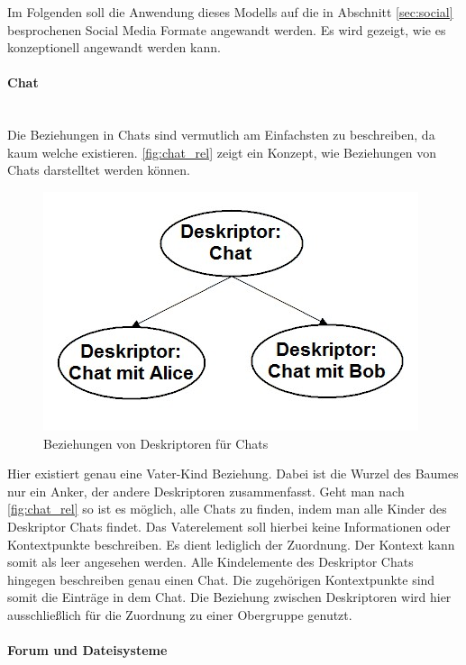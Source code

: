\documentclass[a4paper]{article}
\begin{document}
	Im Folgenden soll die Anwendung dieses Modells auf die in Abschnitt
	\ref{sec:social} besprochenen Social Media Formate angewandt werden. 
	Es wird gezeigt, wie es	konzeptionell angewandt werden kann.
	
	\paragraph{Chat}\mbox{} \\
	
	Die Beziehungen in Chats sind vermutlich am Einfachsten zu beschreiben, da
	kaum welche existieren. \autoref{fig:chat_rel} zeigt ein Konzept, wie
	Beziehungen von Chats darstelltet werden können.

	\begin{figure}[H]
		\centerline{
			\includegraphics[scale=0.6]{../Bilder/chat_rel.jpg}
		}
		\caption{Beziehungen von Deskriptoren für Chats}
		\label{fig:chat_rel}
	\end{figure}
	
	Hier existiert genau eine Vater-Kind Beziehung. Dabei ist die
	Wurzel des Baumes nur ein Anker, der andere Deskriptoren zusammenfasst.
	Geht man nach \autoref{fig:chat_rel} so ist es möglich, alle Chats
	zu finden, indem man alle Kinder des Deskriptor Chats findet. Das
	Vaterelement soll hierbei keine Informationen oder Kontextpunkte
	beschreiben. Es dient lediglich der Zuordnung. Der Kontext kann somit als
	leer angesehen werden. Alle Kindelemente des Deskriptor Chats hingegen
	beschreiben genau einen Chat. Die zugehörigen Kontextpunkte sind somit die
	Einträge in dem Chat. Die Beziehung zwischen Deskriptoren wird hier 
	ausschließlich für die Zuordnung zu einer Obergruppe genutzt. 
		
	\paragraph{Forum und Dateisysteme}\mbox{} \\
	
\end{document}
